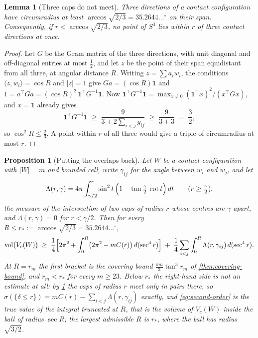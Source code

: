 \documentclass[11pt,reqno]{amsart}
\renewcommand{\_}{\origunderscore\allowbreak}
\numberwithin{equation}{section}
\theoremstyle{plain}
\newtheorem{prop}[thm]{Proposition}
\newtheorem{lem}[thm]{Lemma}
\theoremstyle{definition}
\theoremstyle{remark}
\DeclareMathOperator{\vol}{vol}
\begin{document}
\begin{lem}[Three caps do not meet]\label{lem:no-triples}
Three directions of a contact configuration have circumradius at least
$\arccos\sqrt{2/3}=35.2644\ldots^\circ$ on their span. Consequently, if
$r<\arccos\sqrt{2/3}$, no point of $S^3$ lies within $r$ of three
contact directions at once.
\end{lem}

\begin{proof}
Let $G$ be the Gram matrix of the three directions, with unit diagonal
and off-diagonal entries at most $\tfrac12$, and let $z$ be the point
of their span equidistant from all three, at angular distance $R$.
Writing $z=\sum a_iw_i$, the conditions $\langle z,w_i\rangle=\cos R$
and $|z|=1$ give $Ga=(\cos R)\mathbf1$ and
$1=a^{\top}Ga=(\cos R)^2\,\mathbf1^{\top}G^{-1}\mathbf1$. Now
$\mathbf1^{\top}G^{-1}\mathbf1=\max_{x\ne0}(\mathbf1^{\top}x)^2/(x^{\top}Gx)$,
and $x=\mathbf1$ already gives
\[
  \mathbf1^{\top}G^{-1}\mathbf1\;\ge\;
  \frac{9}{3+2\sum_{i<j}g_{ij}}\;\ge\;\frac{9}{3+3}\;=\;\frac32 ,
\]
so $\cos^2R\le\tfrac23$. A point within $r$ of all three would give a
triple of circumradius at most $r$.
\end{proof}

\begin{prop}[Putting the overlaps back]\label{prop:second-order}
Let $W$ be a contact configuration with $|W|=m$ and bounded cell, write
$\gamma_{ij}$ for the angle between $w_i$ and $w_j$, and let
\begin{equation}\label{eq:lens}
  \Lambda(r,\gamma)=4\pi\int_{\gamma/2}^{r}
    \sin^2t\,\Bigl(1-\tan\tfrac{\gamma}{2}\,\cot t\Bigr)\,dt
  \qquad (r\ge\tfrac{\gamma}{2}),
\end{equation}
the measure of the intersection of two caps of radius $r$ whose centres
are $\gamma$ apart, and $\Lambda(r,\gamma)=0$ for $r<\gamma/2$. Then for
every $R\le r_*:=\arccos\sqrt{2/3}=35.2644\ldots^\circ$,
\begin{equation}\label{eq:second-order}
  \vol\bigl(V_c(W)\bigr)\;\ge\;
  \frac14\Bigl[2\pi^2+\int_0^{R}\bigl(2\pi^2-mC(r)\bigr)\,d(\sec^4r)\Bigr]
  \;+\;\frac14\sum_{i<j}\int_0^{R}\Lambda(r,\gamma_{ij})\,d(\sec^4r) .
\end{equation}
At $R=r_m$ the first bracket is the covering bound $\tfrac{\pi m}{3}\tan^3r_m$
of \cref{thm:covering-bound}, and $r_m<r_*$ for every $m\ge23$. Below
$r_*$ the right-hand side is not an estimate at all: by
\cref{lem:no-triples} the caps of radius $r$ meet only in pairs there, so
$\sigma(\{\delta\le r\})=mC(r)-\sum_{i<j}\Lambda(r,\gamma_{ij})$
exactly, and \eqref{eq:second-order} is the true value of the integral
truncated at $R$, that is the volume of $V_c(W)$ inside the ball of
radius $\sec R$; the largest admissible $R$ is $r_*$, where the ball has
radius $\sqrt{3/2}$.
\end{prop}
\end{document}
